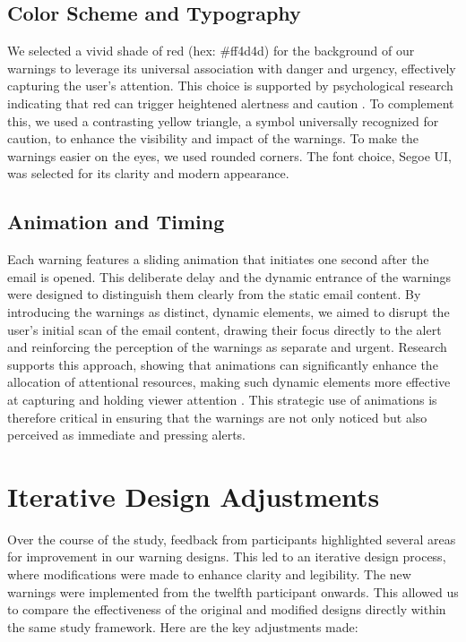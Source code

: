 \documentclass[
  a4paper,  %
  twoside,  %
  bibliography=totoc,
  headsepline,
  cleardoublepage=empty,
  parskip=half,
  draft=false
]{scrbook}
\begin{document}
\subsection{Color Scheme and Typography}
We selected a vivid shade of red (hex: \#ff4d4d) for the background of our warnings to leverage its universal association with danger and urgency, effectively capturing the user's attention. This choice is supported by psychological research indicating that red can trigger heightened alertness and caution \cite{kuniecki}. To complement this, we used a contrasting yellow triangle, a symbol universally recognized for caution, to enhance the visibility and impact of the warnings. To make the warnings easier on the eyes, we used rounded corners.
The font choice, Segoe UI, was selected for its clarity and modern appearance. 

\subsection{Animation and Timing}
Each warning features a sliding animation that initiates one second after the email is opened. This deliberate delay and the dynamic entrance of the warnings were designed to distinguish them clearly from the static email content. By introducing the warnings as distinct, dynamic elements, we aimed to disrupt the user's initial scan of the email content, drawing their focus directly to the alert and reinforcing the perception of the warnings as separate and urgent. Research supports this approach, showing that animations can significantly enhance the allocation of attentional resources, making such dynamic elements more effective at capturing and holding viewer attention \cite{muller}. This strategic use of animations is therefore critical in ensuring that the warnings are not only noticed but also perceived as immediate and pressing alerts.

\section{Iterative Design Adjustments}
\label{adjust}
Over the course of the study, feedback from participants highlighted several areas for improvement in our warning designs. This led to an iterative design process, where modifications were made to enhance clarity and legibility. The new warnings were implemented from the twelfth participant onwards. This allowed us to compare the effectiveness of the original and modified designs directly within the same study framework. Here are the key adjustments made:
\end{document}
